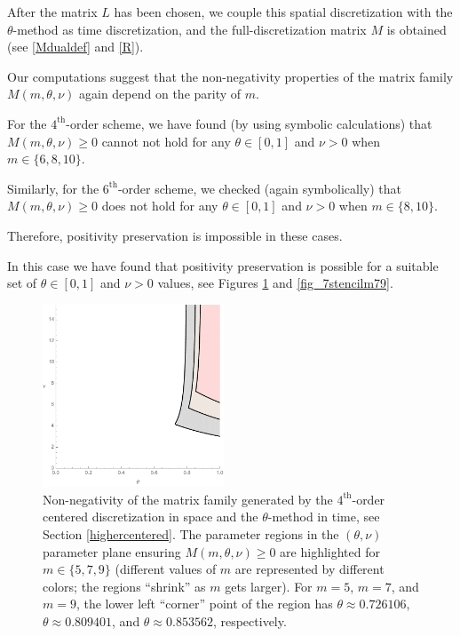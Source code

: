 \documentclass[a4paper]{article}
\newcommand{\te}{\theta}
\begin{document}
After the matrix $L$ has been chosen, we couple this spatial discretization with the $\theta$-method as time discretization, and the full-discretization matrix $M$ is obtained (see \eqref{Mdualdef} and \eqref{R}). 

Our computations suggest that the non-negativity properties of the matrix family $M(m,\theta,\nu)$ again depend on the parity of $m$. 

\begin{description}[style=unboxed,leftmargin=0cm]
\item [{Case 1:} $m$ is {even}.] For the $4^\text{th}$-order scheme, we have found (by using symbolic calculations) that $M(m,\theta,\nu)\ge 0$ cannot not hold for any $\theta\in[0,1]$ and $\nu>0$ when $m\in\{6,8,10\}$.

Similarly, for the $6^\text{th}$-order scheme, we checked (again symbolically) that $M(m,\theta,\nu)\ge 0$ does not hold for any $\theta\in[0,1]$ and $\nu>0$ when $m\in\{8,10\}$.

Therefore, positivity preservation is impossible in these cases.



\item [{Case 2:} $m$ is {odd}.] In this case we have found that positivity preservation is possible for a suitable set of $\theta\in[0,1]$ and $\nu>0$ values, see 
Figures \ref{fig_5stencilm579} and \ref{fig_7stencilm79}.
\end{description}

\begin{figure}
\begin{center}
\includegraphics[width=0.48\textwidth]{fig_5stencilm579.pdf}
\caption{Non-negativity of the matrix family generated by the $4^\text{th}$-order centered discretization in space and the $\theta$-method in time, see Section \ref{highercentered}. The parameter regions in the $(\te,\nu)$ parameter plane ensuring $M(m,\te,\nu)\ge 0$ are highlighted for $m\in\{5, 7, 9\}$ (different values of $m$ are represented by different colors; the regions ``shrink'' as $m$ gets larger). For $m=5$, $m=7$, and $m=9$, the lower left ``corner'' point of the region has $\theta\approx 0.726106$, $\theta\approx 0.809401$, and $\theta\approx 0.853562$, respectively.}\label{fig_5stencilm579}
\end{center}
\end{figure}
\end{document}
